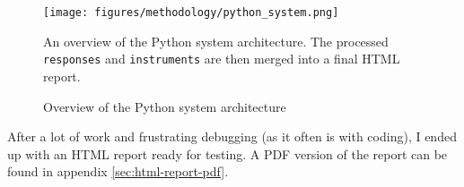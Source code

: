 \begin{figure}[H]
    \centering
    \texttt{[image: figures/methodology/python\_system.png]}
    \caption{Overview of the Python system architecture}
    \medskip
    \small
    \raggedright
    An overview of the Python system architecture. The processed \texttt{responses} and \texttt{instruments} are then merged into a final HTML report.
    \label{fig:python-system-overview}
\end{figure}

\noindent
After a lot of work and frustrating debugging (as it often is with coding), I ended up with an HTML report ready for testing. A PDF version of the report can be found in appendix \autoref{sec:html-report-pdf}.
